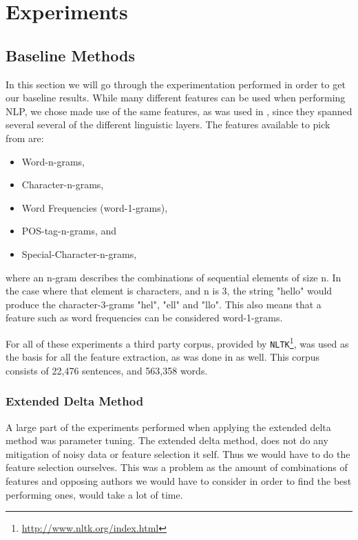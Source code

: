 \section{Experiments} \label{sec:experiments}


\subsection{Baseline Methods}

In this section we will go through the experimentation performed in order to get
our baseline results. While many different features can be used when performing
\gls{NLP}, we chose made use of the same features, as was used in \cite{US},
since they spanned several several of the different linguistic layers. The
features available to pick from are:

\begin{itemize}
    \item Word-n-grams,
    \item Character-n-grams,
    \item Word Frequencies (word-1-grams),
    \item \gls{POS}-tag-n-grams, and
    \item Special-Character-n-grams,
\end{itemize}

where an n-gram describes the combinations of sequential elements of size n. In
the case where that element is characters, and n is 3, the string "hello" would
produce the character-3-grams "hel", "ell" and "llo". This also means that a
feature such as word frequencies can be considered word-1-grams.

For all of these experiments a third party corpus, provided by
\texttt{NLTK}\footnote{\url{http://www.nltk.org/index.html}}, was used as the
basis for all the feature extraction, as was done in \cite{US} as well. This
corpus consists of 22,476 sentences, and 563,358 words.


\subsubsection{Extended Delta Method}

A large part of the experiments performed when applying the extended delta
method was parameter tuning. The extended delta method, does not do any
mitigation of noisy data or feature selection it self. Thus we would have
to do the feature selection ourselves. This was a problem as the amount of
combinations of features and opposing authors we would have to consider in
order to find the best performing ones, would take a lot of time.

